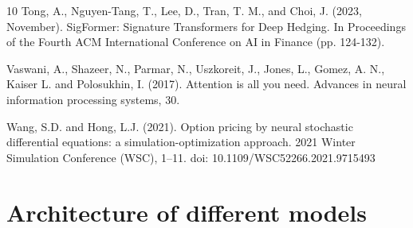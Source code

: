\documentclass[]{article}
\renewcommand{\(}{\left(}
\renewcommand{\)}{\right)}
\begin{document}
\begin{thebibliography}{10}
		Tong, A., Nguyen-Tang, T., Lee, D., Tran, T. M., and Choi, J. (2023, November). SigFormer: Signature Transformers for Deep Hedging. In Proceedings of the Fourth ACM International Conference on AI in Finance (pp. 124-132).
		
		Vaswani, A., Shazeer, N., Parmar, N., Uszkoreit, J., Jones, L., Gomez, A. N., Kaiser L. and Polosukhin, I. (2017). Attention is all you need. Advances in neural information processing systems, 30.
		
		Wang, S.D. and Hong, L.J. (2021). Option pricing by neural stochastic differential equations: a simulation-optimization approach. 2021 Winter Simulation Conference (WSC), 1--11. doi: 10.1109/WSC52266.2021.9715493
		
		
		
	\end{thebibliography}
	
	\appendix
	\section{Architecture of different models}
\end{document}
